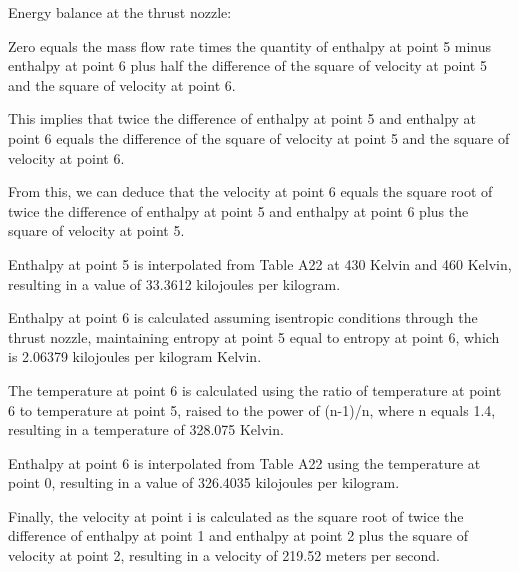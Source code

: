 Energy balance at the thrust nozzle:

Zero equals the mass flow rate times the quantity of enthalpy at point 5 minus enthalpy at point 6 plus half the difference of the square of velocity at point 5 and the square of velocity at point 6.

This implies that twice the difference of enthalpy at point 5 and enthalpy at point 6 equals the difference of the square of velocity at point 5 and the square of velocity at point 6.

From this, we can deduce that the velocity at point 6 equals the square root of twice the difference of enthalpy at point 5 and enthalpy at point 6 plus the square of velocity at point 5.

Enthalpy at point 5 is interpolated from Table A22 at 430 Kelvin and 460 Kelvin, resulting in a value of 33.3612 kilojoules per kilogram.

Enthalpy at point 6 is calculated assuming isentropic conditions through the thrust nozzle, maintaining entropy at point 5 equal to entropy at point 6, which is 2.06379 kilojoules per kilogram Kelvin.

The temperature at point 6 is calculated using the ratio of temperature at point 6 to temperature at point 5, raised to the power of (n-1)/n, where n equals 1.4, resulting in a temperature of 328.075 Kelvin.

Enthalpy at point 6 is interpolated from Table A22 using the temperature at point 0, resulting in a value of 326.4035 kilojoules per kilogram.

Finally, the velocity at point i is calculated as the square root of twice the difference of enthalpy at point 1 and enthalpy at point 2 plus the square of velocity at point 2, resulting in a velocity of 219.52 meters per second.